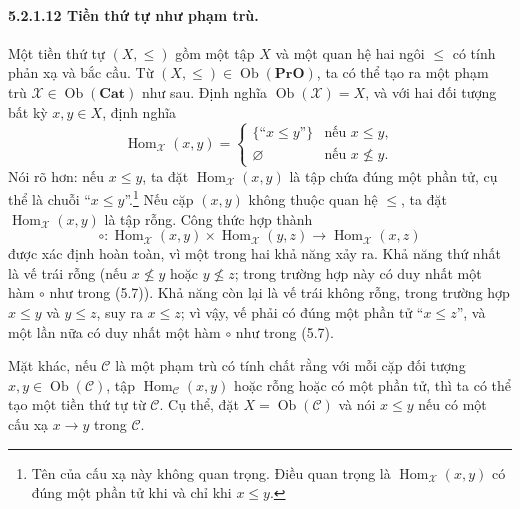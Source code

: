 \paragraph{5.2.1.12 Tiền thứ tự như phạm trù.} Một tiền thứ tự $(X,\leq)$ gồm một tập $X$ và một quan hệ hai ngôi $\leq$ có tính phản xạ và bắc cầu. Từ $(X,\leq)\in\operatorname{Ob}(\mathbf{PrO})$, ta có thể tạo ra một phạm trù $\mathcal X\in\operatorname{Ob}(\mathbf{Cat})$ như sau. Định nghĩa $\operatorname{Ob}(\mathcal X)=X$, và với hai đối tượng bất kỳ $x,y\in X$, định nghĩa
\[\operatorname{Hom}_{\mathcal X}(x,y)=\begin{cases}\{\text{``}x\leq y\text{''}\}&\text{nếu }x\leq y,\\\varnothing&\text{nếu }x\nleq y.\end{cases}\]
Nói rõ hơn: nếu $x\leq y$, ta đặt $\operatorname{Hom}_{\mathcal X}(x,y)$ là tập chứa đúng một phần tử, cụ thể là chuỗi ``$x\leq y$''.\footnote{Tên của cấu xạ này không quan trọng. Điều quan trọng là $\operatorname{Hom}_{\mathcal X}(x,y)$ có đúng một phần tử khi và chỉ khi $x\leq y$.} Nếu cặp $(x,y)$ không thuộc quan hệ $\leq$, ta đặt $\operatorname{Hom}_{\mathcal X}(x,y)$ là tập rỗng. Công thức hợp thành
\begin{equation*}\circ:\operatorname{Hom}_{\mathcal X}(x,y)\times\operatorname{Hom}_{\mathcal X}(y,z)\longrightarrow\operatorname{Hom}_{\mathcal X}(x,z)\tag{5.7}\end{equation*}
được xác định hoàn toàn, vì một trong hai khả năng xảy ra. Khả năng thứ nhất là vế trái rỗng (nếu $x\nleq y$ hoặc $y\nleq z$; trong trường hợp này có duy nhất một hàm $\circ$ như trong (5.7)). Khả năng còn lại là vế trái không rỗng, trong trường hợp $x\leq y$ và $y\leq z$, suy ra $x\leq z$; vì vậy, vế phải có đúng một phần tử ``$x\leq z$'', và một lần nữa có duy nhất một hàm $\circ$ như trong (5.7).

Mặt khác, nếu $\mathcal C$ là một phạm trù có tính chất rằng với mỗi cặp đối tượng $x,y\in\operatorname{Ob}(\mathcal C)$, tập $\operatorname{Hom}_{\mathcal C}(x,y)$ hoặc rỗng hoặc có một phần tử, thì ta có thể tạo một tiền thứ tự từ $\mathcal C$. Cụ thể, đặt $X=\operatorname{Ob}(\mathcal C)$ và nói $x\leq y$ nếu có một cấu xạ $x\to y$ trong $\mathcal C$.
